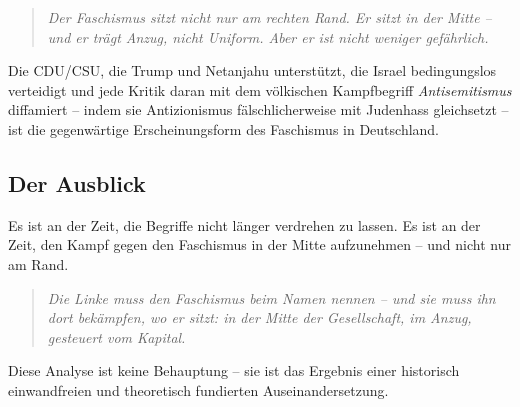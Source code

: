 \begin{quote}
\emph{Der Faschismus sitzt nicht nur am rechten Rand. Er sitzt in der Mitte – und er trägt Anzug, nicht Uniform. Aber er ist nicht weniger gefährlich.}
\end{quote}

Die CDU/CSU, die Trump und Netanjahu unterstützt, die Israel bedingungslos verteidigt und jede Kritik daran mit dem völkischen Kampfbegriff \emph{Antisemitismus} diffamiert – indem sie Antizionismus fälschlicherweise mit Judenhass gleichsetzt – ist die gegenwärtige Erscheinungsform des Faschismus in Deutschland.

\subsection{Der Ausblick}

Es ist an der Zeit, die Begriffe nicht länger verdrehen zu lassen. Es ist an der Zeit, den Kampf gegen den Faschismus in der Mitte aufzunehmen – und nicht nur am Rand.

\begin{quote}
\emph{Die Linke muss den Faschismus beim Namen nennen – und sie muss ihn dort bekämpfen, wo er sitzt: in der Mitte der Gesellschaft, im Anzug, gesteuert vom Kapital.}
\end{quote}

Diese Analyse ist keine Behauptung – sie ist das Ergebnis einer historisch einwandfreien und theoretisch fundierten Auseinandersetzung.